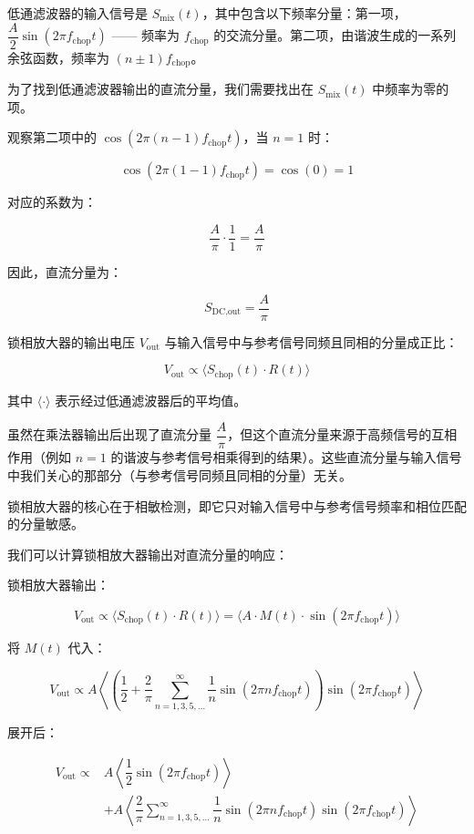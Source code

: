 低通滤波器的输入信号是 \( S_{\text{mix}}(t) \)，其中包含以下频率分量：第一项，\( \dfrac{A}{2} \sin(2\pi f_{\text{chop}} t) \) —— 频率为 \( f_{\text{chop}} \) 的交流分量。第二项，由谐波生成的一系列余弦函数，频率为 \( (n \pm 1) f_{\text{chop}} \)。

为了找到低通滤波器输出的直流分量，我们需要找出在 \( S_{\text{mix}}(t) \) 中频率为零的项。

观察第二项中的 \( \cos(2\pi (n - 1) f_{\text{chop}} t) \)，当 \( n = 1 \) 时：

\[
\cos(2\pi (1 - 1) f_{\text{chop}} t) = \cos(0) = 1
\]

对应的系数为：

\[
\dfrac{A}{\pi} \cdot \dfrac{1}{1} = \dfrac{A}{\pi}
\]

因此，直流分量为：

\[
S_{\text{DC,out}} = \dfrac{A}{\pi}
\]

锁相放大器的输出电压 \( V_{\text{out}} \) 与输入信号中与参考信号同频且同相的分量成正比：

\[
V_{\text{out}} \propto \langle S_{\text{chop}}(t) \cdot R(t) \rangle
\]

其中 \( \langle \cdot \rangle \) 表示经过低通滤波器后的平均值。

虽然在乘法器输出后出现了直流分量 \( \dfrac{A}{\pi} \)，但这个直流分量来源于高频信号的互相作用（例如 \( n = 1 \) 的谐波与参考信号相乘得到的结果）。这些直流分量与输入信号中我们关心的那部分（与参考信号同频且同相的分量）无关。

锁相放大器的核心在于相敏检测，即它只对输入信号中与参考信号频率和相位匹配的分量敏感。

我们可以计算锁相放大器输出对直流分量的响应：

锁相放大器输出：

\[
V_{\text{out}} \propto \langle S_{\text{chop}}(t) \cdot R(t) \rangle = \langle A \cdot M(t) \cdot \sin(2\pi f_{\text{chop}} t) \rangle
\]

将 \( M(t) \) 代入：

\[
V_{\text{out}} \propto A \left\langle \left( \dfrac{1}{2} + \dfrac{2}{\pi} \sum_{n=1,3,5,\dots}^{\infty} \dfrac{1}{n} \sin(2\pi n f_{\text{chop}} t) \right) \sin(2\pi f_{\text{chop}} t) \right\rangle
\]

展开后：

\[
\begin{aligned}
	V_{\text{out}} \propto & A \left\langle \dfrac{1}{2} \sin(2\pi f_{\text{chop}} t) \right\rangle \\
	& + A \left\langle \dfrac{2}{\pi} \sum_{n=1,3,5,\dots}^{\infty} \dfrac{1}{n} \sin(2\pi n f_{\text{chop}} t) \sin(2\pi f_{\text{chop}} t) \right\rangle
\end{aligned}
\]

